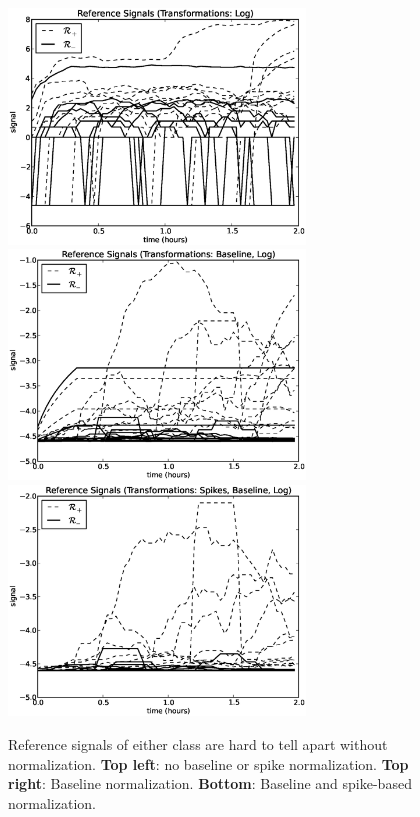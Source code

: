 \begin{figure}[h!]
\begin{center}
\includegraphics[width=3.10in]{../fig/final/signal_transform/log.eps}\includegraphics[width=3.10in]{../fig/final/signal_transform/log_baseline.eps}
\includegraphics[width=3.10in]{../fig/final/signal_transform/log_baseline_spikes.eps}
\end{center}
\caption{\label{fig:baseline_spikes} Reference signals of either class are hard to tell apart without normalization. {\bf Top left}: no baseline or spike normalization. {\bf Top right}: Baseline normalization. {\bf Bottom}: Baseline and spike-based normalization.}
\end{figure}

